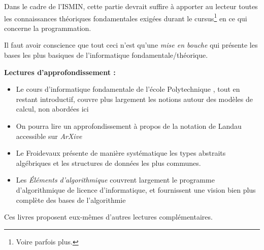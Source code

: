\documentclass[../../main.tex]{subfiles}
\begin{document}
Dans le cadre de l'ISMIN, cette partie devrait suffire à apporter au lecteur toutes les connaissances théoriques fondamentales exigées durant le cursus\footnote{Voire parfois plus.} en ce qui concerne la programmation.

Il faut avoir conscience que tout ceci n'est qu'une \textit{mise en bouche} qui présente les bases les plus basiques de l'informatique fondamentale/théorique.

\textbf{Lectures d'approfondissement :}
\begin{itemize}
	\item Le cours d'informatique fondamentale de l'école Polytechnique \cite{XFI}, tout en restant introductif, couvre plus largement les notions autour des modèles de calcul, non abordées ici
	\item On pourra lire un approfondissement à propos de la notation de Landau \cite{ONotation} accessible sur \textit{ArXive}
	\item Le Froidevaux \cite{Froidevaux} présente de manière systématique les types abstraits algébriques et les structures de données les plus communes.
	\item Les \textit{Éléments d'algorithmique} \cite{EltAlgorithmie} couvrent largement le programme d'algorithmique de licence d'informatique, et fournissent une vision bien plus complète des bases de l'algorithmie
\end{itemize}
Ces livres proposent eux-mêmes d'autres lectures complémentaires.
\end{document}
